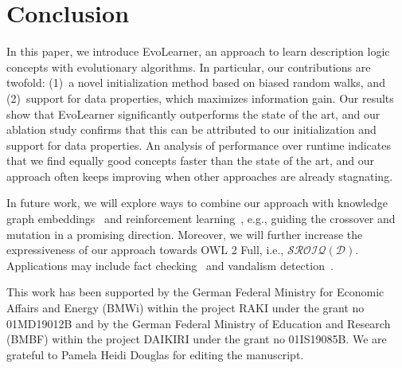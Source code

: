 \section{Conclusion}%
\label{sec:conclusion}

In this paper, we introduce EvoLearner, an approach to learn description logic concepts with evolutionary algorithms. In particular, our contributions are twofold: (1)~a novel initialization method based on biased random walks, and (2)~support for data properties, which maximizes information gain. Our results show that EvoLearner significantly outperforms the state of the art, and our ablation study confirms that this can be attributed to our initialization and support for data properties. An analysis of performance over runtime indicates that we find equally good concepts faster than the state of the art, and our approach often keeps improving when other approaches are already stagnating.

In future work, we will explore ways to combine our approach with knowledge graph embeddings~\cite{Demir2021ConvolutionalComplex, Demir2021ConvolutionalHypercomplex} and reinforcement learning~\cite{Demir2021DRILL}, e.g., guiding the crossover and mutation in a promising direction. Moreover, we will further increase the expressiveness of our approach towards OWL 2 Full, i.e., $\mathcal{SROIQ(D)}$. Applications may include fact checking~\cite{Syed2019Unsupervised} and vandalism detection~\cite{Heindorf2016Vandalism, Heindorf2019Debiasing}.

\begin{acks}
This work has been supported by the German Federal Ministry for Economic Affairs and Energy (BMWi) within the project RAKI under the grant no 01MD19012B and by the German Federal Ministry of Education and Research (BMBF) within the project DAIKIRI under the grant no 01IS19085B. We are grateful to Pamela Heidi Douglas for editing the manuscript.
\end{acks}

